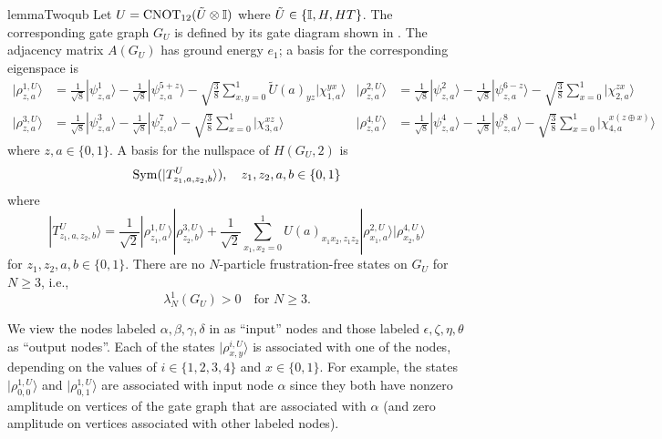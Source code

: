 \documentclass[../thesis-main/thesis-main]{subfiles}
\begin{document}
\begin{restatable}{lemma}{Twoqub}\label{lem:2qub_gate}
Let $U=\mathrm{CNOT}_{12}(\tilde U\otimes\mathbb{I})$ where $\tilde U\in\{\mathbb{I},H,HT\}$. The corresponding gate graph $G_U$ is defined by its gate diagram shown in . The adjacency matrix $A(G_U)$ has ground energy $e_{1}$; a basis for the corresponding eigenspace is
\begin{align}
|\rho_{z,a}^{1,U}\rangle & =\frac{1}{\sqrt{8}}|\psi_{z,a}^{1}\rangle-\frac{1}{\sqrt{8}}|\psi_{z,a}^{5+z}\rangle-\sqrt{\frac{3}{8}}\sum_{x,y=0}^{1}\tilde U(a)_{yz}|\chi_{1,a}^{yx}\rangle
 & |\rho_{z,a}^{2,U}\rangle
 & =\frac{1}{\sqrt{8}}|\psi_{z,a}^{2}\rangle-\frac{1}{\sqrt{8}}|\psi_{z,a}^{6-z}\rangle-\sqrt{\frac{3}{8}}\sum_{x=0}^{1}|\chi_{2,a}^{zx}\rangle\label{eq:rho1_1}\\
|\rho_{z,a}^{3,U}\rangle & =\frac{1}{\sqrt{8}}|\psi_{z,a}^{3}\rangle-\frac{1}{\sqrt{8}}|\psi_{z,a}^{7}\rangle-\sqrt{\frac{3}{8}}\sum_{x=0}^{1}|\chi_{3,a}^{xz}\rangle 
& |\rho_{z,a}^{4,U}\rangle & =\frac{1}{\sqrt{8}}|\psi_{z,a}^{4}\rangle-\frac{1}{\sqrt{8}}|\psi_{z,a}^{8}\rangle-\sqrt{\frac{3}{8}}\sum_{x=0}^{1}|\chi_{4,a}^{x\left(z\oplus x\right)}\rangle\label{eq:rho2_1}
\end{align}
where $z,a\in\{0,1\}$. A basis for the nullspace of $H(G_U,2)$ is
\begin{equation}
\operatorname{Sym}(|T_{z_{1},a,z_{2},b}^U\rangle),\quad z_{1},z_{2},a,b\in\{0,1\}\label{eq:twopartstate_1}
\end{equation}
where 
\begin{equation}
|T_{z_{1},a,z_{2},b}^U\rangle=\frac{1}{\sqrt{2}}|\rho_{z_{1},a}^{1,U}\rangle|\rho_{z_{2},b}^{3,U}\rangle+\frac{1}{\sqrt{2}}\sum_{x_1,x_2=0}^{1}U(a)_{x_{1}x_{2},z_{1}z_{2}}|\rho_{x_{1},a}^{2,U}\rangle|\rho_{x_{2},b}^{4,U}\rangle\label{eq:twopartstate_2}
\end{equation}
for $z_{1},z_{2},a,b\in\{0,1\}$. There are no $N$-particle frustration-free
states on $G_U$ for $N\geq3$, i.e., 
\[
\lambda_{N}^{1}(G_U)>0\quad\text{for }N\geq3.
\]
\end{restatable}

We view the nodes labeled $\alpha,\beta,\gamma,\delta$ in  as ``input'' nodes and those labeled $\epsilon, \zeta,\eta,\theta$ as ``output nodes''. Each of the states $|\rho_{x,y}^{i,U}\rangle$ is associated with one of the nodes, depending on the values of $i\in\{1,2,3,4\}$ and $x\in\{0,1\}$. For example, the states $|\rho_{0,0}^{1,U}\rangle$ and $|\rho_{0,1}^{1,U}\rangle$ are associated with input node $\alpha$ since they both have nonzero amplitude on vertices of the gate graph that are associated with $\alpha$ (and zero amplitude on vertices associated with other labeled nodes).
\end{document}
